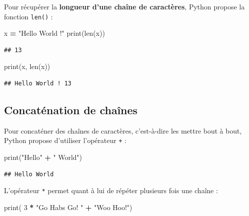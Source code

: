 \documentclass[
  12pt,
]{book}
\newenvironment{Shaded}{\begin{snugshade}}{\end{snugshade}}
\newcommand{\BuiltInTok}[1]{#1}
\newcommand{\DecValTok}[1]{\textcolor[rgb]{0.00,0.00,0.81}{#1}}
\newcommand{\NormalTok}[1]{#1}
\newcommand{\OperatorTok}[1]{\textcolor[rgb]{0.81,0.36,0.00}{\textbf{#1}}}
\newcommand{\StringTok}[1]{\textcolor[rgb]{0.31,0.60,0.02}{#1}}
\numberwithin{equation}{section}
\numberwithin{countremarque}{section}
\begin{document}
Pour récupérer la \textbf{longueur d'une chaîne de caractères}, Python propose la fonction \texttt{len()} :

\begin{Shaded}
\begin{Highlighting}[]
\NormalTok{x }\OperatorTok{=} \StringTok{"Hello World !"}
\BuiltInTok{print}\NormalTok{(}\BuiltInTok{len}\NormalTok{(x))}
\end{Highlighting}
\end{Shaded}

\begin{lstlisting}
## 13
\end{lstlisting}

\begin{Shaded}
\begin{Highlighting}[]
\BuiltInTok{print}\NormalTok{(x, }\BuiltInTok{len}\NormalTok{(x))}
\end{Highlighting}
\end{Shaded}

\begin{lstlisting}
## Hello World ! 13
\end{lstlisting}

\subsection{Concaténation de chaînes}\label{type-chaines-concatenation}

Pour concaténer des chaînes de caractères, c'est-à-dire les mettre bout à bout, Python propose d'utiliser l'opérateur \texttt{+} :

\begin{Shaded}
\begin{Highlighting}[]
\BuiltInTok{print}\NormalTok{(}\StringTok{"Hello"} \OperatorTok{+} \StringTok{" World"}\NormalTok{)}
\end{Highlighting}
\end{Shaded}

\begin{lstlisting}
## Hello World
\end{lstlisting}

L'opérateur \texttt{*} permet quant à lui de répéter plusieurs fois une chaîne :

\begin{Shaded}
\begin{Highlighting}[]
\BuiltInTok{print}\NormalTok{( }\DecValTok{3} \OperatorTok{*} \StringTok{"Go Habs Go! "} \OperatorTok{+} \StringTok{"Woo Hoo!"}\NormalTok{)}
\end{Highlighting}
\end{Shaded}
\end{document}
